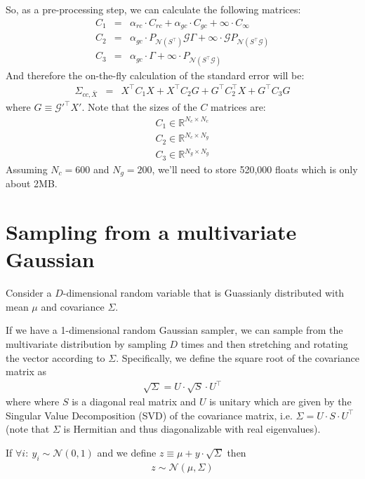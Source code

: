 \documentclass[11pt]{article}
\newcommand{\Gmat}{\mathcal{G}}
\newcommand{\PNmat}[1]{P_{\mathcal{N}\left(#1\right)}}
\begin{document}
So, as a pre-processing step, we can calculate the following matrices:
\begin{eqnarray}
	C_1 &=& \alpha_{rc} \cdot C_{rc} + \alpha_{gc} \cdot C_{gc} + \infty \cdot C_\infty \\
	C_2 &=& \alpha_{gc} \cdot \PNmat{S^\top} \Gmat \Gamma + \infty \cdot \Gmat \PNmat{S^\top\Gmat} \\
	C_3 &=& \alpha_{gc} \cdot \Gamma + \infty \cdot \PNmat{S^\top\Gmat} 
\end{eqnarray}
And therefore the on-the-fly calculation of the standard error will be:
\begin{eqnarray}
	\Sigma_{cc,\bar{X}} &=& X^\top C_1 X + X^\top C_2 G + G^\top C_2^\top X + G^\top C_3 G
\end{eqnarray}
where $G \equiv \Gmat'^\top X'$. Note that the sizes of the $C$ matrices are:
\begin{eqnarray}
	C_1 \in \mathbb{R}^{N_c \times N_c} \\
	C_2 \in \mathbb{R}^{N_c \times N_g} \\
	C_3 \in \mathbb{R}^{N_g \times N_g}
\end{eqnarray}
Assuming $N_c = 600$ and $N_g = 200$, we'll need to store 520,000 floats which is only about 2MB.

\section{Sampling from a multivariate Gaussian}
Consider a $D$-dimensional random variable that is Guassianly distributed with mean $\mu$ and covariance $\Sigma$.

If we have a 1-dimensional random Gaussian sampler, we can sample from the multivariate distribution by sampling $D$ times and then stretching and rotating the vector according to $\Sigma$. Specifically, we define the square root of the covariance matrix as
\begin{eqnarray}
	\sqrt{\Sigma} = U \cdot \sqrt{S} \cdot U^\top
\end{eqnarray}
where where $S$ is a diagonal real matrix and $U$ is unitary which are given by the Singular Value Decomposition (SVD) of the covariance matrix, i.e. $\Sigma = U \cdot S \cdot U^\top$ (note that $\Sigma$ is Hermitian and thus diagonalizable with real eigenvalues).

If $\forall i :~ y_i \sim \mathcal{N}(0, 1)$ and we define $z \equiv \mu + y \cdot \sqrt{\Sigma}$ then
\begin{eqnarray}
z \sim \mathcal{N}(\mu, \Sigma)
\end{eqnarray}
\end{document}
